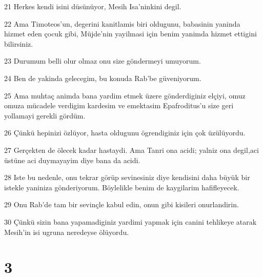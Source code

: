 \par 21 Herkes kendi isini düsünüyor, Mesih Isa'ninkini degil.
\par 22 Ama Timoteos'un, degerini kanitlamis biri oldugunu, babasinin yaninda hizmet eden çocuk gibi, Müjde'nin yayilmasi için benim yanimda hizmet ettigini bilirsiniz.
\par 23 Durumum belli olur olmaz onu size göndermeyi umuyorum.
\par 24 Ben de yakinda gelecegim, bu konuda Rab'be güveniyorum.
\par 25 Ama muhtaç animda bana yardim etmek üzere gönderdiginiz elçiyi, omuz omuza mücadele verdigim kardesim ve emektasim Epafroditus'u size geri yollamayi gerekli gördüm.
\par 26 Çünkü hepinizi özlüyor, hasta oldugunu ögrendiginiz için çok üzülüyordu.
\par 27 Gerçekten de ölecek kadar hastaydi. Ama Tanri ona acidi; yalniz ona degil,aci üstüne aci duymayayim diye bana da acidi.
\par 28 Iste bu nedenle, onu tekrar görüp sevinesiniz diye kendisini daha büyük bir istekle yaniniza gönderiyorum. Böylelikle benim de kaygilarim hafifleyecek.
\par 29 Onu Rab'de tam bir sevinçle kabul edin, onun gibi kisileri onurlandirin.
\par 30 Çünkü sizin bana yapamadiginiz yardimi yapmak için canini tehlikeye atarak Mesih'in isi ugruna neredeyse ölüyordu.

\chapter{3}


